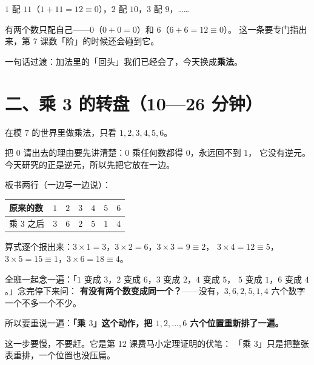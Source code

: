 \(1\) 配 \(11\)（\(1+11=12\equiv0\)），\(2\) 配 \(10\)，\(3\) 配 \(9\)，……

\begin{zhu}
  有两个数只配自己——\(0\)（\(0+0=0\)）和 \(6\)（\(6+6=12\equiv0\)）。
  这一条要专门指出来，第 7 课数「阶」的时候还会碰到它。
\end{zhu}

一句话过渡：加法里的「回头」我们已经会了，今天换成\textbf{乘法}。

\section*{二、乘 3 的转盘（10—26 分钟）}

在模 \(7\) 的世界里做乘法，只看 \(1,2,3,4,5,6\)。

\begin{zhu}
  把 \(0\) 请出去的理由要先讲清楚：\(0\) 乘任何数都得 \(0\)，永远回不到 \(1\)，
  它没有逆元。今天研究的正是逆元，所以先把它放在一边。
\end{zhu}

板书两行（一边写一边说）：

\begin{center}
\begin{tabular}{@{}lcccccc@{}}
  \toprule
  原来的数 & \(1\) & \(2\) & \(3\) & \(4\) & \(5\) & \(6\) \\
  \midrule
  乘 \(3\) 之后 & \(3\) & \(6\) & \(2\) & \(5\) & \(1\) & \(4\) \\
  \bottomrule
\end{tabular}
\end{center}

算式逐个报出来：\(3\times1=3\)，\(3\times2=6\)，\(3\times3=9\equiv2\)，
\(3\times4=12\equiv5\)，\(3\times5=15\equiv1\)，\(3\times6=18\equiv4\)。

\begin{caozuo}
  全班一起念一遍：「\(1\) 变成 \(3\)，\(2\) 变成 \(6\)，\(3\) 变成 \(2\)，\(4\) 变成 \(5\)，
  \(5\) 变成 \(1\)，\(6\) 变成 \(4\)。」念完停下来问：
  \textbf{有没有两个数变成同一个？}——没有，\(3,6,2,5,1,4\) 六个数字一个不多一个不少。
\end{caozuo}

所以要重说一遍：\textbf{「乘 \(3\)」这个动作，把 \(1,2,\dots,6\) 六个位置重新排了一遍。}

\begin{zhu}
  这一步要慢，不要赶。它是第 12 课费马小定理证明的伏笔：
  「乘 \(3\)」只是把整张表重排，一个位置也没压扁。
\end{zhu}

